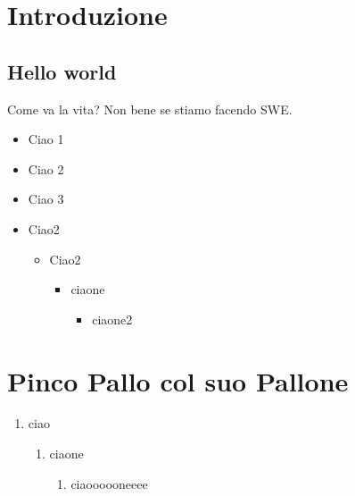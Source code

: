 \section{Introduzione}

\subsection{Hello world}

Come va la vita? Non bene se stiamo facendo SWE.

\begin{itemize}
	\item Ciao 1
	\item Ciao 2
	\item Ciao 3
\end{itemize}

\lipsum[3-5]


\begin{itemize}
	\item Ciao2
	\begin{itemize}
		\item Ciao2
		\begin{itemize}
			\item ciaone
			\begin{itemize}
				\item ciaone2
			\end{itemize}
		\end{itemize}
	\end{itemize}
\end{itemize}


\section{Pinco Pallo col suo Pallone}

\begin{enumerate}
	\item ciao
	\begin{enumerate}
		\item ciaone
		\begin{enumerate}
			\item ciaoooooneeee
		\end{enumerate}
	\end{enumerate}
\end{enumerate}